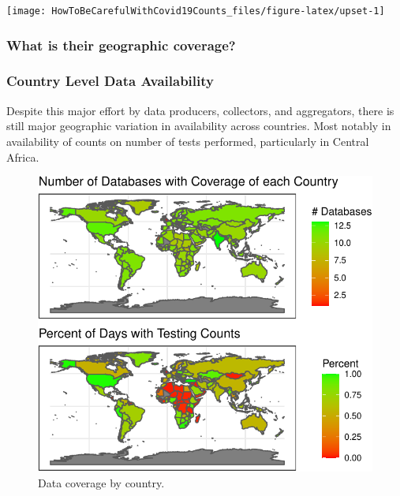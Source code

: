 \documentclass[
]{book}
\begin{document}
\begin{center}\texttt{[image: HowToBeCarefulWithCovid19Counts\_files/figure-latex/upset-1]} \end{center}

\hypertarget{what-is-their-geographic-coverage}{%
\subsubsection{What is their geographic coverage?}\label{what-is-their-geographic-coverage}}

\hypertarget{country-level-data-availability}{%
\subsubsection{Country Level Data Availability}\label{country-level-data-availability}}

Despite this major effort by data producers, collectors, and aggregators, there is still major geographic variation in availability across countries. Most notably in availability of counts on number of tests performed, particularly in Central Africa.

\begin{figure}

{\centering \includegraphics{HowToBeCarefulWithCovid19Counts_files/figure-latex/nice-fig2-1} 

}

\caption{Data coverage by country.}\label{fig:nice-fig2}
\end{figure}
\end{document}
